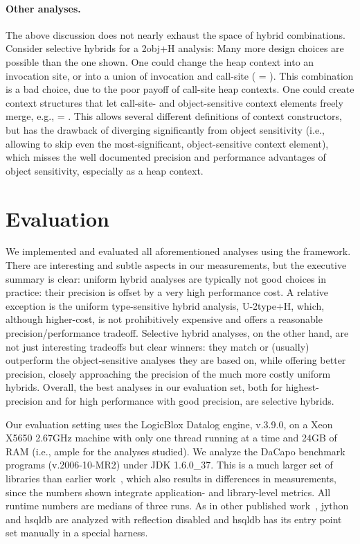 \paragraph[Other analyses]{Other analyses.}
The above discussion does not nearly exhaust the space of hybrid combinations. Consider selective hybrids for a 2obj+H analysis: Many more design choices are possible than the one shown. One could change the heap context into an invocation site, or into a union of invocation and call-site ( = ). This combination is a bad choice, due to the poor payoff of call-site heap contexts. One could create context structures that let call-site- and object-sensitive context elements freely merge, e.g.,  = . This allows several different definitions of context constructors, but has the drawback of diverging significantly from object sensitivity (i.e., allowing to skip even the most-significant, object-sensitive context element), which misses the well documented precision and performance advantages of object sensitivity, especially as a heap context.


\section{Evaluation}
\label{sec:evaluation}

We implemented and evaluated all aforementioned analyses using the \doop{} framework. There are interesting and subtle aspects in our measurements, but the executive summary is clear: uniform hybrid analyses are typically not good choices in practice: their precision is offset by a very high performance cost. A relative exception is the uniform type-sensitive hybrid analysis, U-2type+H, which, although higher-cost, is not prohibitively expensive and offers a reasonable precision/performance tradeoff.  Selective hybrid analyses, on the other hand, are not just interesting tradeoffs but clear winners: they match or (usually) outperform the object-sensitive analyses they are based on, while offering better precision, closely approaching the precision of the much more costly uniform hybrids. Overall, the best analyses in our evaluation set, both for highest-precision and for high performance with good precision, are selective hybrids.

Our evaluation setting uses the LogicBlox Datalog engine, v.3.9.0, on a Xeon X5650 2.67GHz machine with only one thread running at a time and 24GB of RAM (i.e., ample for the analyses studied). We analyze the DaCapo benchmark programs (v.2006-10-MR2) under JDK 1.6.0\_37. This is a much larger set of libraries than earlier work~\cite{oopsla:2009:Bravenboer,popl:2011:Smaragdakis}, which also results in differences in measurements, since the numbers shown integrate application- and library-level metrics. All runtime numbers are medians of three runs. As in other published work~\cite{popl:2011:Smaragdakis,ecoop:2012:Ali}, jython and hsqldb are analyzed with reflection disabled and hsqldb has its entry point set manually in a special harness.

